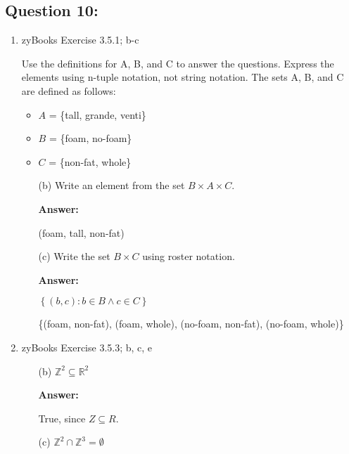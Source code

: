\documentclass[14pt]{extreport}
\newcommand{\answer}[0]{\medskip \textbf{Answer:} \medskip}
\newcommand{\intersect}[0]{\cap}
\begin{document}
\subsection*{Question 10:}

\begin{enumerate}
    
    \item zyBooks Exercise 3.5.1; b-c

    Use the definitions for A, B, and C to answer the questions. Express the elements using n-tuple notation, not string notation. The sets A, B, and C are defined as follows:
    \begin{itemize}
        \item \( A \) = \{tall, grande, venti\}
        \item \( B \) = \{foam, no-foam\}
        \item \( C \) = \{non-fat, whole\}
    \end{itemize}
    
        \begin{enumerate}

            \item[(b)] Write an element from the set \( B \times A \times C \).
            
                \answer

                (foam, tall, non-fat)

            \item[(c)] Write the set \( B \times C \) using roster notation.
            
                \answer

                \( \left\{ (b, c): b \in B \land c \in C \right\} \)

                \{(foam, non-fat), (foam, whole), (no-foam, non-fat), (no-foam, whole)\}
        \end{enumerate}

    \item zyBooks Exercise 3.5.3; b, c, e
    
        \begin{enumerate}
            
            \item[(b)] \( \mathbb{Z}^2 \subseteq \mathbb{R}^2 \)
            
                \answer

                True, since \( Z \subseteq R \).

            \item[(c)] \( \mathbb{Z}^2 \intersect \mathbb{Z}^3 = \emptyset \)
            

\end{enumerate}
\end{enumerate}
\end{document}
